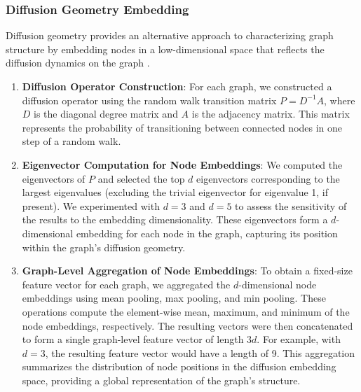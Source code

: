 \documentclass[twocolumn]{aastex631}
\begin{document}
\subsubsection{Diffusion Geometry Embedding}
Diffusion geometry provides an alternative approach to characterizing graph structure by embedding nodes in a low-dimensional space that reflects the diffusion dynamics on the graph \citep{berger2017visualizingtimevaryingparticleflows,jagvaral2023unifiedframeworkdiffusiongenerative}.
\begin{enumerate}
    \item \textbf{Diffusion Operator Construction}: For each graph, we constructed a diffusion operator using the random walk transition matrix $P = D^{-1}A$, where $D$ is the diagonal degree matrix and $A$ is the adjacency matrix. This matrix represents the probability of transitioning between connected nodes in one step of a random walk.
    \item \textbf{Eigenvector Computation for Node Embeddings}: We computed the eigenvectors of $P$ and selected the top $d$ eigenvectors corresponding to the largest eigenvalues (excluding the trivial eigenvector for eigenvalue 1, if present). We experimented with $d=3$ and $d=5$ to assess the sensitivity of the results to the embedding dimensionality. These eigenvectors form a $d$-dimensional embedding for each node in the graph, capturing its position within the graph's diffusion geometry.
    \item \textbf{Graph-Level Aggregation of Node Embeddings}: To obtain a fixed-size feature vector for each graph, we aggregated the $d$-dimensional node embeddings using mean pooling, max pooling, and min pooling. These operations compute the element-wise mean, maximum, and minimum of the node embeddings, respectively. The resulting vectors were then concatenated to form a single graph-level feature vector of length $3d$. For example, with $d=3$, the resulting feature vector would have a length of 9. This aggregation summarizes the distribution of node positions in the diffusion embedding space, providing a global representation of the graph's structure.
\end{enumerate}
\end{document}
